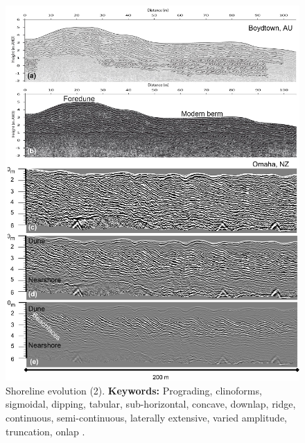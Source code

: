 \begin{figure}[h!]
    \centering
    \includegraphics[width=0.9\linewidth]{Figures/0.2GPR/dougherty2019-2.png}
    \caption[Shoreline evolution (2).]{Shoreline evolution (2). \textbf{Keywords: } Prograding, clinoforms, sigmoidal, dipping, tabular, sub-horizontal, concave, downlap, ridge, continuous, semi-continuous, laterally extensive, varied amplitude, truncation, onlap \citep{Dougherty2019}.}
    \label{fig:dougherty2019-2}
\end{figure}


